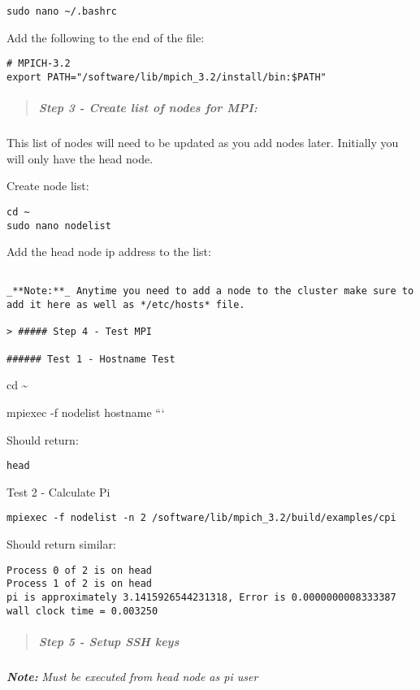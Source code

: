 \documentclass[]{article}
\let\oldsubparagraph\subparagraph
\renewcommand{\subparagraph}[1]{\oldsubparagraph{#1}\mbox{}}
\begin{document}
\texttt{sudo\ nano\ \textasciitilde{}/.bashrc}

Add the following to the end of the file:

\begin{verbatim}
# MPICH-3.2
export PATH="/software/lib/mpich_3.2/install/bin:$PATH"
\end{verbatim}

\begin{quote}
\mbox{}%
\subparagraph{Step 3 - Create list of nodes for
MPI:}\label{step-3---create-list-of-nodes-for-mpi}
\end{quote}

This list of nodes will need to be updated as you add nodes later.
Initially you will only have the head node.

Create node list:

\begin{verbatim}
cd ~
sudo nano nodelist
\end{verbatim}

Add the head node ip address to the list:

\begin{verbatim}

_**Note:**_ Anytime you need to add a node to the cluster make sure to add it here as well as */etc/hosts* file.

> ##### Step 4 - Test MPI

###### Test 1 - Hostname Test
\end{verbatim}

cd \textasciitilde{}

mpiexec -f nodelist hostname ```

Should return:

\texttt{head}

Test 2 - Calculate Pi

\texttt{mpiexec\ -f\ nodelist\ -n\ 2\ /software/lib/mpich\_3.2/build/examples/cpi}

Should return similar:

\begin{verbatim}
Process 0 of 2 is on head
Process 1 of 2 is on head
pi is approximately 3.1415926544231318, Error is 0.0000000008333387
wall clock time = 0.003250
\end{verbatim}

\begin{quote}
\mbox{}%
\subparagraph{Step 5 - Setup SSH keys}\label{step-5---setup-ssh-keys}
\end{quote}

\emph{\textbf{Note:}} \emph{Must be executed from head node as pi user}
\end{document}
